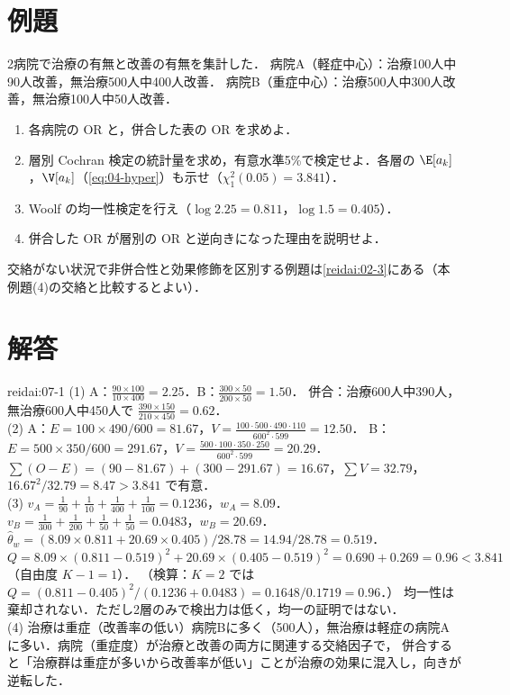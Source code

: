 \section{例題}\label{sec:07-ex}
\begin{reidai}\label{reidai:07-1}
2病院で治療の有無と改善の有無を集計した．
病院A（軽症中心）：治療100人中90人改善，無治療500人中400人改善．
病院B（重症中心）：治療500人中300人改善，無治療100人中50人改善．
\begin{enumerate}[label=(\arabic*)]
\item 各病院の OR と，併合した表の OR を求めよ．
\item 層別 Cochran 検定の統計量を求め，有意水準5\%で検定せよ．各層の $\E[a_k]$，$\V[a_k]$（\cref{eq:04-hyper}）も示せ（$\chi^2_1(0.05)=3.841$）．
\item Woolf の均一性検定を行え（$\log2.25=0.811$，$\log1.5=0.405$）．
\item 併合した OR が層別の OR と逆向きになった理由を説明せよ．
\end{enumerate}
\end{reidai}
交絡がない状況で非併合性と効果修飾を区別する例題は\cref{reidai:02-3}にある（本例題(4)の交絡と比較するとよい）．

\section{解答}\label{sec:07-sol}
\begin{kaitou}{reidai:07-1}
(1) A：$\frac{90\times100}{10\times400}=2.25$．B：$\frac{300\times50}{200\times50}=1.50$．
併合：治療600人中390人，無治療600人中450人で $\frac{390\times150}{210\times450}=0.62$．\\
(2) A：$E=100\times490/600=81.67$，$V=\frac{100\cdot500\cdot490\cdot110}{600^2\cdot599}=12.50$．
B：$E=500\times350/600=291.67$，$V=\frac{500\cdot100\cdot350\cdot250}{600^2\cdot599}=20.29$．
$\sum(O-E)=(90-81.67)+(300-291.67)=16.67$，$\sum V=32.79$，$16.67^2/32.79=8.47>3.841$ で有意．\\
(3) $v_A=\frac1{90}+\frac1{10}+\frac1{400}+\frac1{100}=0.1236$，$w_A=8.09$．
$v_B=\frac1{300}+\frac1{200}+\frac1{50}+\frac1{50}=0.0483$，$w_B=20.69$．
$\hat\theta_w=(8.09\times0.811+20.69\times0.405)/28.78=14.94/28.78=0.519$．
$Q=8.09\times(0.811-0.519)^2+20.69\times(0.405-0.519)^2=0.690+0.269=0.96<3.841$（自由度 $K-1=1$）．
（検算：$K=2$ では $Q=(0.811-0.405)^2/(0.1236+0.0483)=0.1648/0.1719=0.96$．）
均一性は棄却されない．ただし2層のみで検出力は低く，均一の証明ではない．\\
(4) 治療は重症（改善率の低い）病院Bに多く（500人），無治療は軽症の病院Aに多い．病院（重症度）が治療と改善の両方に関連する交絡因子で，
併合すると「治療群は重症が多いから改善率が低い」ことが治療の効果に混入し，向きが逆転した．
\end{kaitou}

